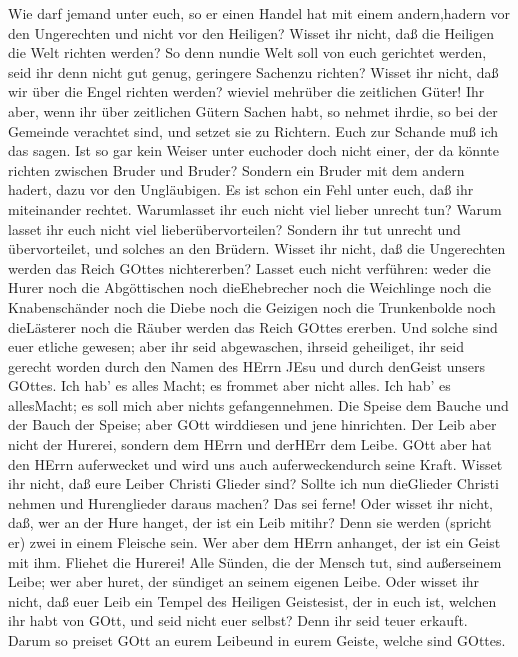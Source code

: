  Wie darf jemand unter euch, so er einen Handel hat mit
einem andern,hadern vor den Ungerechten und nicht vor den Heiligen?
 Wisset ihr nicht, daß die Heiligen die Welt richten werden?
So denn nundie Welt soll von euch gerichtet werden, seid ihr denn nicht
gut genug, geringere Sachenzu richten?  Wisset ihr nicht,
daß wir über die Engel richten werden? wieviel mehrüber die zeitlichen
Güter!  Ihr aber, wenn ihr über zeitlichen Gütern Sachen
habt, so nehmet ihrdie, so bei der Gemeinde verachtet sind, und setzet
sie zu Richtern.  Euch zur Schande muß ich das sagen. Ist so
gar kein Weiser unter euchoder doch nicht einer, der da könnte richten
zwischen Bruder und Bruder?  Sondern ein Bruder mit dem
andern hadert, dazu vor den Ungläubigen.  Es ist schon ein
Fehl unter euch, daß ihr miteinander rechtet. Warumlasset ihr euch nicht
viel lieber unrecht tun? Warum lasset ihr euch nicht viel
lieberübervorteilen?  Sondern ihr tut unrecht und
übervorteilet, und solches an den Brüdern.  Wisset ihr
nicht, daß die Ungerechten werden das Reich GOttes nichtererben? Lasset
euch nicht verführen: weder die Hurer noch die Abgöttischen noch
dieEhebrecher noch die Weichlinge noch die Knabenschänder 
noch die Diebe noch die Geizigen noch die Trunkenbolde noch dieLästerer
noch die Räuber werden das Reich GOttes ererben.  Und
solche sind euer etliche gewesen; aber ihr seid abgewaschen, ihrseid
geheiliget, ihr seid gerecht worden durch den Namen des HErrn JEsu und
durch denGeist unsers GOttes.  Ich hab' es alles Macht; es
frommet aber nicht alles. Ich hab' es allesMacht; es soll mich aber
nichts gefangennehmen.  Die Speise dem Bauche und der Bauch
der Speise; aber GOtt wirddiesen und jene hinrichten. Der Leib aber
nicht der Hurerei, sondern dem HErrn und derHErr dem Leibe.
 GOtt aber hat den HErrn auferwecket und wird uns auch
auferweckendurch seine Kraft.  Wisset ihr nicht, daß eure
Leiber Christi Glieder sind? Sollte ich nun dieGlieder Christi nehmen
und Hurenglieder daraus machen? Das sei ferne!  Oder wisset
ihr nicht, daß, wer an der Hure hanget, der ist ein Leib mitihr? Denn
sie werden (spricht er) zwei in einem Fleische sein.  Wer
aber dem HErrn anhanget, der ist ein Geist mit ihm. 
Fliehet die Hurerei! Alle Sünden, die der Mensch tut, sind außerseinem
Leibe; wer aber huret, der sündiget an seinem eigenen Leibe.
 Oder wisset ihr nicht, daß euer Leib ein Tempel des
Heiligen Geistesist, der in euch ist, welchen ihr habt von GOtt, und
seid nicht euer selbst?  Denn ihr seid teuer erkauft. Darum
so preiset GOtt an eurem Leibeund in eurem Geiste, welche sind GOttes.

